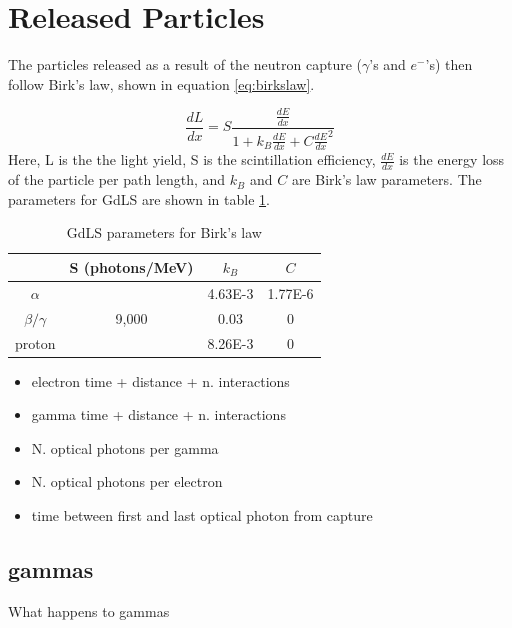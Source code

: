 



\section{Released Particles}
\par
The particles released as a result of the neutron capture ($\gamma$'s and $e^{-}$'s) then follow Birk's law, shown in equation \ref{eq:birkslaw}.

\begin{equation}
    \frac{dL}{dx} = S \frac{\frac{dE}{dx}}{1 + k_{B}\frac{dE}{dx} + C\frac{dE}{dx}^2}
    \label{eq:birkslaw}
\end{equation}
Here, L is the the light yield, S is the scintillation efficiency, $\frac{dE}{dx}$ is the energy loss of the particle per path length, and $k_{B}$ and $C$ are Birk's law parameters.
The parameters for GdLS are shown in table \ref{tab:Birks_law_parameters}.


\begin{table}[!htbp]
    \centering
    \begin{tabular}{c | c | c | c }
                   & S (photons/MeV) & $k_{B}$ & $C$ \\ \hline
    $\alpha$       &                 & 4.63E-3 & 1.77E-6 \\
    $\beta/\gamma$ & 9,000           & 0.03    & 0 \\ 
    proton         &                 & 8.26E-3 & 0
    \end{tabular}
    \caption{GdLS parameters for Birk's law}
    \label{tab:Birks_law_parameters}
\end{table} 

\begin{itemize}
    \item electron time + distance + n. interactions
    \item gamma time + distance + n. interactions
    \item N. optical photons per gamma
    \item N. optical photons per electron
    \item time between first and last optical photon from capture
\end{itemize}

\subsection{gammas}
\par
What happens to gammas



